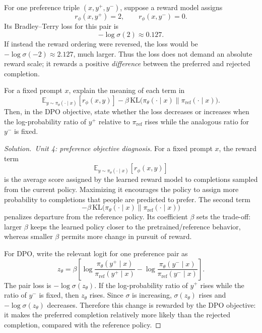 \documentclass[11pt,a4paper]{article}
\theoremstyle{definition}
\newenvironment{solution}[1][]{\begin{proof}[Solution.\ #1]}{\end{proof}}
\begin{document}
\begin{example}
For one preference triple $(x,y^+,y^-)$, suppose a reward model assigns
\[
r_\phi(x,y^+)=2,
\qquad
r_\phi(x,y^-)=0.
\]
Its Bradley--Terry loss for this pair is
\[
-\log\sigma(2)\approx 0.127.
\]
If instead the reward ordering were reversed, the loss would be
$-\log\sigma(-2)\approx 2.127$, much larger. Thus the loss does not demand an absolute
reward scale; it rewards a positive \emph{difference} between the preferred and rejected
completion.
\end{example}

\begin{exercise}
For a fixed prompt $x$, explain the meaning of each term in
\[
\mathbb{E}_{y\sim\pi_\theta(\cdot\mid x)}[r_\phi(x,y)]
-\beta\,\mathrm{KL}\bigl(
\pi_\theta(\cdot\mid x)\mathbin{\|}\pi_{\mathrm{ref}}(\cdot\mid x)
\bigr).
\]
Then, in the DPO objective, state whether the loss decreases or increases when the
log-probability ratio of $y^+$ relative to $\pi_{\mathrm{ref}}$ rises while the analogous
ratio for $y^-$ is fixed.
\end{exercise}

\begin{solution}[Unit 4: preference objective diagnosis]
For a fixed prompt $x$, the reward term
\[
\mathbb{E}_{y\sim\pi_\theta(\cdot\mid x)}[r_\phi(x,y)]
\]
is the average score assigned by the learned reward model to completions sampled from the
current policy. Maximizing it encourages the policy to assign more probability to completions
that people are predicted to prefer. The second term
\[
-\beta\,\mathrm{KL}\bigl(
\pi_\theta(\cdot\mid x)\mathbin{\|}\pi_{\mathrm{ref}}(\cdot\mid x)
\bigr)
\]
penalizes departure from the reference policy. Its coefficient $\beta$ sets the trade-off:
larger $\beta$ keeps the learned policy closer to the pretrained/reference behavior, whereas
smaller $\beta$ permits more change in pursuit of reward.

For DPO, write the relevant logit for one preference pair as
\[
z_\theta
=\beta\left[
\log\frac{\pi_\theta(y^+\mid x)}{\pi_{\mathrm{ref}}(y^+\mid x)}
-\log\frac{\pi_\theta(y^-\mid x)}{\pi_{\mathrm{ref}}(y^-\mid x)}
\right].
\]
The pair loss is $-\log\sigma(z_\theta)$. If the log-probability ratio of $y^+$ rises while
the ratio of $y^-$ is fixed, then $z_\theta$ rises. Since $\sigma$ is increasing,
$\sigma(z_\theta)$ rises and $-\log\sigma(z_\theta)$ decreases. Therefore this change is
rewarded by the DPO objective: it makes the preferred completion relatively more likely than
the rejected completion, compared with the reference policy.
\end{solution}
\end{document}

